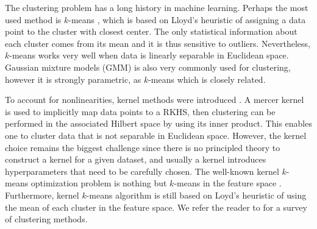 \documentclass[aps,preprint,nofootinbib,floatfix]{revtex4-1}
\begin{document}
The clustering problem has a long history in machine learning.
Perhaps the most used method is $k$-means \cite{Lloyd,MacQueen,Forgy}, which
is based on Lloyd's heuristic \cite{Lloyd} of assigning a data point to
the cluster with closest center. The only statistical 
information about each cluster
comes from its mean and it is thus sensitive to outliers.
Nevertheless,
$k$-means works very well when data is linearly separable 
in Euclidean space.
Gaussian mixture models (GMM) is also very commonly used for 
clustering,
however it is strongly parametric, as $k$-means which is closely related.

To account for nonlinearities, kernel methods were introduced 
\cite{Smola,Girolami}. A mercer kernel \cite{Mercer} is used to implicitly
map data points to a RKHS, then clustering can be performed in the associated
Hilbert
space by using its inner product. 
This enables one to cluster data that is not separable in Euclidean space.
However, the kernel choice remains the biggest challenge
since there is no principled theory to construct a kernel for a given dataset,
and usually a kernel introduces
hyperparameters that need to be carefully chosen.
The well-known
kernel $k$-means optimization problem is nothing but $k$-means in the
feature space \cite{Girolami}. Furthermore, kernel $k$-means algorithm
\cite{Dhillon2,Dhillon} is still based on Loyd's heuristic \cite{Lloyd} of
using the mean of each cluster in the feature space. 
We refer the reader to \cite{Filippone} for a survey of clustering
methods.
\end{document}
